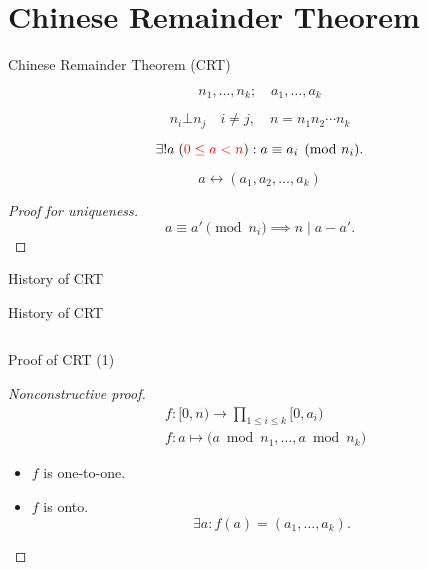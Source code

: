 \section{Chinese Remainder Theorem}

\begin{frame}{Chinese Remainder Theorem (CRT)}
  \begin{theorem}[CRT]
	\[
	  n_1, \ldots, n_k; \quad a_1, \ldots, a_k
	\]

	\[ 
	  n_i \bot n_j \quad i \neq j, \quad n = n_1n_2\cdots n_k 
	\]

    \[
	  \exists! a\; (\textcolor{red}{0 \le a < n}): a \equiv a_i \pmod{n_i}.
	\]
  \end{theorem}

  \pause
  \[
	a \leftrightarrow (a_1, a_2, \ldots, a_k)
  \]

  \pause
  \begin{proof}[Proof for uniqueness]
	\[
	  a \equiv a' \pmod{n_i} \implies n \mid a - a'.
	\]
  \end{proof}
\end{frame}
\begin{frame}{History of CRT}
\end{frame}
\begin{frame}{History of CRT}
  \begin{columns}
	\pause
  \end{columns}
\end{frame}
\begin{frame}{Proof of CRT (1)}
  \begin{proof}[Nonconstructive proof]
	\begin{align*}
	  &f: [0,n) \to \prod_{1 \le i \le k} [0,a_i) \\
	  &f: a \mapsto \big( a \bmod n_1, \dots, a \bmod n_k \big)
	\end{align*}

	\pause

	\begin{itemize}[<+->]
	  \item $f$ is one-to-one.
	  \item $f$ is onto.
		\[
		  \exists a: f(a) = (a_1, \dots, a_k).
		\]
	\end{itemize}
  \end{proof}
\end{frame}

